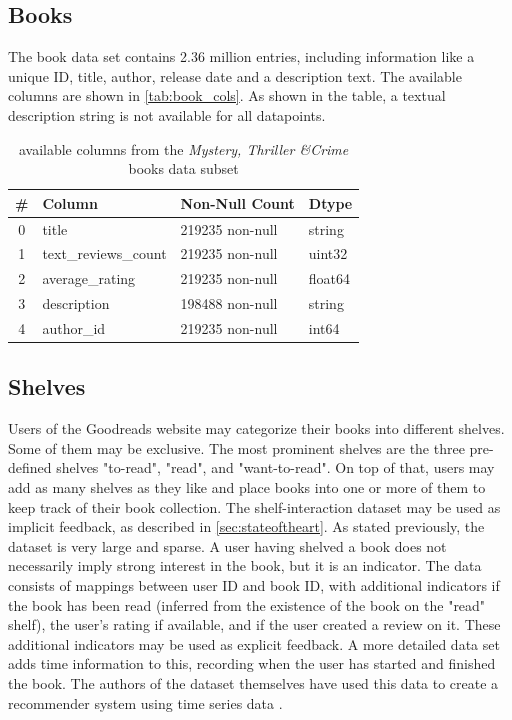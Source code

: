 \documentclass[10pt,final,journal,a4paper,oneside,twocolumn]{IEEEtran}
\begin{document}
\subsection{Books}
The book data set contains 2.36 million entries, including information like a unique ID, title, author, release date and a description text. The available columns are shown in \autoref{tab:book_cols}. As shown in the table, a textual description string is not available for all datapoints.
\begin{table}[h]        
    \begin{center}
        \begin{tabular}{clll}
            \toprule
            \# & Column & Non-Null Count & Dtype \\
            \midrule
            0 & title & 219235 non-null & string \\
            1 & text\_reviews\_count & 219235 non-null & uint32 \\
            2 & average\_rating & 219235 non-null & float64 \\
            3 & description & 198488 non-null & string \\
            4 & author\_id & 219235 non-null & int64 \\
            \bottomrule
        \end{tabular}
    \end{center}
\caption{available columns from the \emph{Mystery, Thriller \&Crime} books data subset}
\label{tab:book_cols}
\end{table}
    

\subsection{Shelves}
Users of the Goodreads website may categorize their books into different shelves. Some of them may be exclusive. The most prominent shelves are the three pre-defined shelves "to-read", "read", and "want-to-read". On top of that, users may add as many shelves as they like and place books into one or more of them to keep track of their book collection.
The shelf-interaction dataset may be used as implicit feedback, as described in \autoref{sec:stateoftheart}. As stated previously, the dataset is very large and sparse. A user having shelved a book does not necessarily imply strong interest in the book, but it is an indicator. 
The data consists of mappings between user ID and book ID, with additional indicators if the book has been read (inferred from the existence of the book on the "read" shelf), the user's rating if available, and if the user created a review on it. These additional indicators may be used as explicit feedback.
A more detailed data set adds time information to this, recording when the user has started and finished the book. The authors of the dataset themselves have used this data to create a recommender system using time series data \cite{Pera.2018}.
\end{document}
